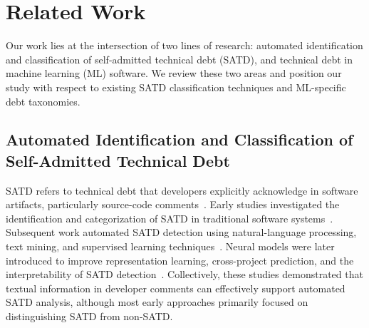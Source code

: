 \documentclass[acmsmall,screen,review,anonymous]{acmart}
\begin{document}

\section{Related Work}
\label{sec:related_work}

Our work lies at the intersection of two lines of research: automated identification and classification of self-admitted technical debt (SATD), and technical debt in machine learning (ML) software. We review these two areas and position our study with respect to existing SATD classification techniques and ML-specific debt taxonomies.

\subsection{Automated Identification and Classification of Self-Admitted Technical Debt}

SATD refers to technical debt that developers explicitly acknowledge in software artifacts, particularly source-code comments~\cite{potdar2014exploratory}. Early studies investigated the identification and categorization of SATD in traditional software systems~\cite{maldonado2015detecting}. Subsequent work automated SATD detection using natural-language processing, text mining, and supervised learning techniques~\cite{da2017using,huang2018identifying,wattanakriengkrai2019automatic}. Neural models were later introduced to improve representation learning, cross-project prediction, and the interpretability of SATD detection~\cite{ren2019neural}. Collectively, these studies demonstrated that textual information in developer comments can effectively support automated SATD analysis, although most early approaches primarily focused on distinguishing SATD from non-SATD.
\end{document}
